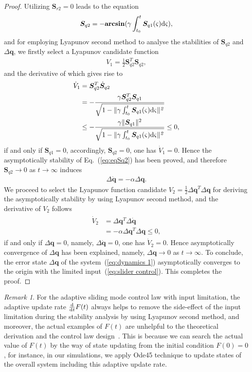 \documentclass[3p]{elsarticle}
\theoremstyle{plain}
\theoremstyle{remark}
\newtheorem{myrem}{Remark}
\begin{document}
\begin{proof}
Utilizing $\bm S_{r2}=0$ leads to the equation
\begin{align}
\bm S_{q2}=-\mathbf{arcsin}(\gamma\int^t_{t_0}\bm S_{q1}(\varsigma) \rm{d}\it{\varsigma}),\label{eq:eqSq2}
\end{align}
and for employing Lyapunov second method to analyse the stabilities of $\bm S_{q2}$ and $\Delta\bm q$, we firstly select a Lyapunov candidate function
\begin{align}
V_1 = \frac{1}{2}\bm S_{q2}^T\bm S_{q2},
\end{align}
and the derivative of which gives rise to
\begin{align}
\begin{split}
\dot V_1 &= \bm S_{q2}^T\dot {\bm S}_{q2}\\
&=-\frac{\gamma \bm S_{q2}^T\bm S_{q1}}{\sqrt{1-\Vert\gamma\int^t_{t_0}\bm S_{q1}(\varsigma) \rm{d}\it{\varsigma\Vert^2}}}\\
&\le -\frac{\gamma \Vert \bm S_{q1}\Vert^2}{\sqrt{1-\Vert\gamma\int^t_{t_0}\bm S_{q1}(\varsigma) \rm{d}\it{\varsigma\Vert^2}}}\le 0,
\end{split}
\end{align}
if and only if $\bm S_{q1} = 0$, accordingly, $\bm S_{q2} = 0$, one has $\dot V_1=0$. Hence the asymptotically stability of Eq.~(\ref{eq:eqSq2}) has been proved, and therefore $\bm S_{q2}\rightarrow 0$ as $t\rightarrow \infty$ induces
\begin{align}
\Delta \dot {\bm q}=-\alpha \Delta \bm q.
\end{align}
We proceed to select the Lyapunov function candidate $V_2=\frac{1}{2}\Delta \bm q^T\Delta\bm q$ for deriving the asymptotically stability by using Lyapunov second method, and the derivative of $V_2$ follows
\begin{align}
\begin{split}
\dot V_2 &= \Delta\bm q^T\Delta \dot{\bm q}\\
&=-\alpha \Delta \bm q^T\Delta \bm q\le 0,
\end{split}
\end{align}
if and only if $\Delta \bm q = 0$, namely, $\Delta \dot {\bm q} = 0$, one has $\dot V_2=0$. Hence asymptotically convergence of $\Delta \bm q$ has been explained, namely, $\Delta \bm q\rightarrow 0$ as $t\rightarrow \infty$. To conclude, the error state $\Delta \bm q$ of the system~(\ref{eq:dynamics 1}) asymptotically converges to the origin with the limited input~(\ref{eq:slider control}). This completes the proof.
\end{proof}
\begin{myrem}
For the adaptive sliding mode control law with input limitation, the adaptive update rate $\frac{\rm{d}}{\rm{d}\it{t}}F(t)$ always helps to remove the side-effect of the input limitation during the stability analysis by using Lyapunov second method, and moreover, the actual examples of $F(t)$ are unhelpful to the theoretical derivation and the control law design~\cite{Hu2008552,6060930}. This is because we can search the actual value of $F(t)$  by the way of state updating from the initial condition $F(0)=0$, for instance, in our simulations, we apply Ode45 technique to update states of the overall system including this adaptive update rate.
\end{myrem}
\end{document}
